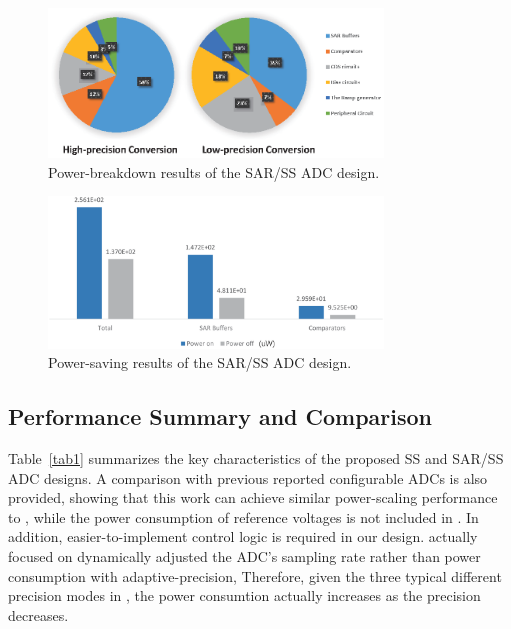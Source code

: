 \begin{figure}[htbp]
	\centerline{\includegraphics[width=3.5in]{./Figures/SARResults1.eps}}
	\caption{Power-breakdown results of the SAR/SS ADC design.}
	\label{SARresults1}
\end{figure} 

\begin{figure}[htbp]
	\centerline{\includegraphics[width=3.5in]{./Figures/SARResults2.eps}}
	\caption{Power-saving results of the SAR/SS ADC design.}
	\label{SARresults2}
\end{figure} 

\subsection{Performance Summary and Comparison}\label{summary}

Table~\ref{tab1} summarizes the key characteristics of the proposed SS and SAR/SS ADC designs. 
A comparison with previous reported configurable ADCs is also provided, showing that this work can achieve similar power-scaling performance to \cite{zhu_6--10-bit_2015}, while the power consumption of reference voltages is not included in \cite{zhu_6--10-bit_2015}. In addition, easier-to-implement control logic is required in our design. \cite{el-halwagy_100-mss5-gss_2018} actually focused on dynamically adjusted the ADC's sampling rate rather than power consumption with adaptive-precision, %
Therefore, given the three typical different precision modes in \cite{el-halwagy_100-mss5-gss_2018}, the power consumtion actually increases as the precision decreases. 


